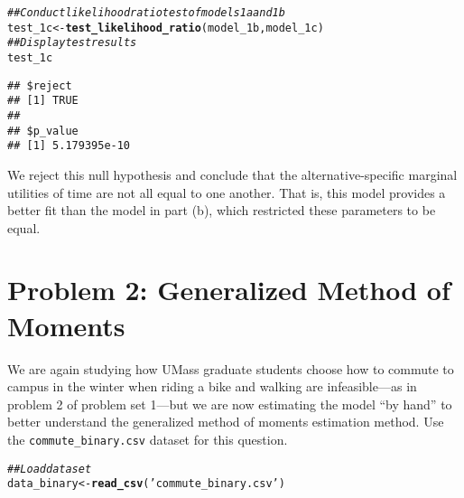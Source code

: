 \documentclass[11pt,letterpaper]{article}\usepackage[]{graphicx}\usepackage[]{color}
\makeatletter
\newcommand{\hlstr}[1]{\textcolor[rgb]{0.192,0.494,0.8}{#1}}%
\newcommand{\hlcom}[1]{\textcolor[rgb]{0.678,0.584,0.686}{\textit{#1}}}%
\newcommand{\hlstd}[1]{\textcolor[rgb]{0.345,0.345,0.345}{#1}}%
\newcommand{\hlkwb}[1]{\textcolor[rgb]{0.69,0.353,0.396}{#1}}%
\newcommand{\hlkwd}[1]{\textcolor[rgb]{0.737,0.353,0.396}{\textbf{#1}}}%
\newenvironment{kframe}{%
 \def\at@end@of@kframe{}%
 \ifinner\ifhmode%
  \def\at@end@of@kframe{\end{minipage}}%
  \begin{minipage}{\columnwidth}%
 \fi\fi%
 \def\FrameCommand##1{\hskip\@totalleftmargin \hskip-\fboxsep
 \colorbox{shadecolor}{##1}\hskip-\fboxsep
     \hskip-\linewidth \hskip-\@totalleftmargin \hskip\columnwidth}%
 \MakeFramed {\advance\hsize-\width
   \@totalleftmargin\z@ \linewidth\hsize
   \@setminipage}}%
 {\par\unskip\endMakeFramed%
 \at@end@of@kframe}
\newenvironment{knitrout}{}{} %
\makeatother
\begin{document}
\begin{enumerate}[label=\alph*., leftmargin=*]
\begin{enumerate}[label=\roman*.]
\begin{knitrout}
\color{fgcolor}\begin{kframe}
\begin{alltt}
\hlcom{## Conduct likelihood ratio test of models 1a and 1b}
\hlstd{test_1c} \hlkwb{<-} \hlkwd{test_likelihood_ratio}\hlstd{(model_1b, model_1c)}
\hlcom{## Display test results}
\hlstd{test_1c}
\end{alltt}
\begin{verbatim}
## $reject
## [1] TRUE
## 
## $p_value
## [1] 5.179395e-10
\end{verbatim}
\end{kframe}
\end{knitrout}

		We reject this null hypothesis and conclude that the alternative-specific marginal utilities of time are not all equal to one another. That is, this model provides a better fit than the model in part (b), which restricted these parameters to be equal.
	\end{enumerate}
\end{enumerate}

\section*{Problem 2: Generalized Method of Moments}

We are again studying how UMass graduate students choose how to commute to campus in the winter when riding a bike and walking are infeasible---as in problem 2 of problem set 1---but we are now estimating the model ``by hand'' to better understand the generalized method of moments estimation method. Use the \texttt{commute\_binary.csv} dataset for this question.

\begin{knitrout}
\color{fgcolor}\begin{kframe}
\begin{alltt}
\hlcom{## Load dataset}
\hlstd{data_binary} \hlkwb{<-} \hlkwd{read_csv}\hlstd{(}\hlstr{'commute_binary.csv'}\hlstd{)}
\end{alltt}


{\ttfamily\noindent\itshape\color{messagecolor}{\#\# Rows: 1000 Columns: 13}}

{\ttfamily\noindent\itshape{}}

{\ttfamily\noindent\itshape\color{messagecolor}{\#\# \\\#\# i Use `spec()` to retrieve the full column specification for this data.\\\#\# i Specify the column types or set `show\_col\_types = FALSE` to quiet this message.}}\end{kframe}
\end{knitrout}
\end{document}
